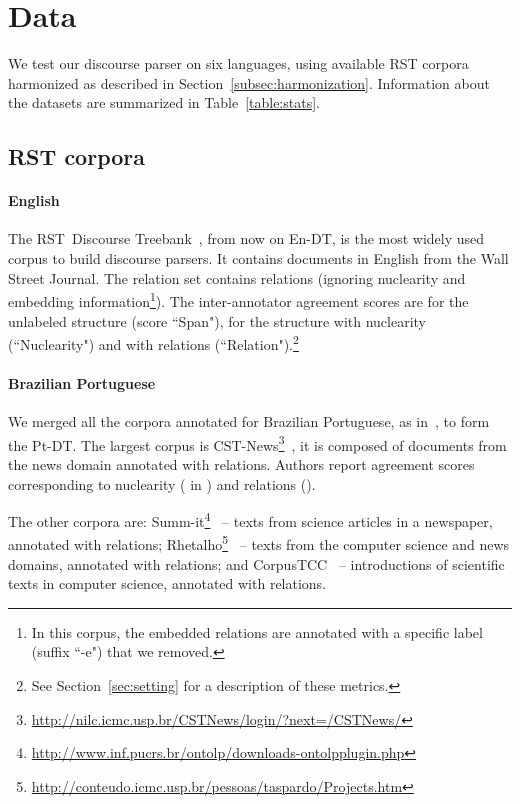 \documentclass[11pt]{article}
\newcommand{\erstdt}{En-DT}
\newcommand{\brrst}{Pt-DT}
\begin{document}
\section{Data}
\label{sec:data}

We test our discourse parser on six languages, using available RST corpora  harmonized as described in Section~\ref{subsec:harmonization}.
Information about the datasets are summarized in Table~\ref{table:stats}.


\subsection{RST corpora}

\paragraph{English}

The RST~Discourse Treebank~\cite{carlson:discourse:2001}, from now on \erstdt, is the most widely used corpus to build discourse parsers.
It contains  documents in English from the Wall Street Journal.
The relation set contains  relations (ignoring nuclearity and embedding information\footnote{In this corpus, the embedded relations are annotated with a specific label (suffix ``-e") that we removed.}).
The inter-annotator agreement scores are  for the unlabeled structure (score ``Span"),  for the structure with nuclearity (``Nuclearity") and  with relations (``Relation").\footnote{See Section~\ref{sec:setting} for a description of these metrics.}

\paragraph{Brazilian Portuguese}

We merged all the corpora annotated for Brazilian Portuguese, as in~\cite{maziero:adaptation:2015}, to form the \brrst.
The largest corpus is CST-News\footnote{\url{http://nilc.icmc.usp.br/CSTNews/login/?next=/CSTNews/}}~\cite{cardoso:cstnews:2011}, it is composed of  documents from the news domain annotated with  relations. 
Authors report agreement scores corresponding to nuclearity ( in ) and relations ().

The other corpora are: 
Summ-it\footnote{\url{http://www.inf.pucrs.br/ontolp/downloads-ontolpplugin.php}}~\cite{collovini:summit:2007} --  texts from science articles in a newspaper, annotated with  relations; Rhetalho\footnote{\url{http://conteudo.icmc.usp.br/pessoas/taspardo/Projects.htm}\label{rhetalho}}~\cite{pardo:rhetalho:2005} --  texts from the computer science and news domains, annotated with  relations; and CorpusTCC~\cite{pardo:construccao:2003,pardo:relaccoes:2004} --  introductions of scientific texts in computer science, annotated with  relations.
\end{document}
